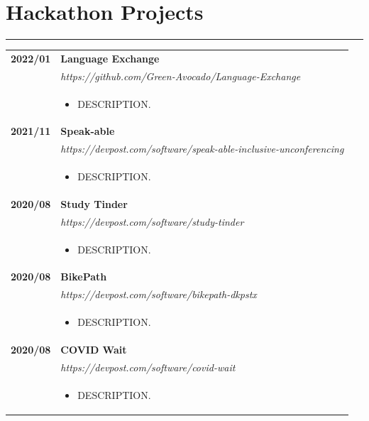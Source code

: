 \documentclass[letterpaper]{article}
\newcommand{\sect}[1]{\section*{#1}
                        {\color{cyan}
                        \rule{\textwidth}{1pt}
                        \vspace{-1ex}}}
\begin{document}
    \sect{Hackathon Projects}

        \begin{tabular}{p{} p{}}
            \textbf{2022/01} & \textbf{Language Exchange} \\
            & \emph{https://github.com/Green-Avocado/Language-Exchange} \\
            & \begin{itemize}
                \item DESCRIPTION.
            \end{itemize}
            \\
            \textbf{2021/11} & \textbf{Speak-able} \\
            & \emph{https://devpost.com/software/speak-able-inclusive-unconferencing} \\
            & \begin{itemize}
                \item DESCRIPTION.
            \end{itemize}
            \\
            \textbf{2020/08} & \textbf{Study Tinder} \\
            & \emph{https://devpost.com/software/study-tinder} \\
            & \begin{itemize}
                \item DESCRIPTION.
            \end{itemize}
            \\
            \textbf{2020/08} & \textbf{BikePath} \\
            & \emph{https://devpost.com/software/bikepath-dkpstx} \\
            & \begin{itemize}
                \item DESCRIPTION.
            \end{itemize}
            \\
            \textbf{2020/08} & \textbf{COVID Wait} \\
            & \emph{https://devpost.com/software/covid-wait} \\
            & \begin{itemize}
                \item DESCRIPTION.
            \end{itemize}
            \\
        \end{tabular}
\end{document}
